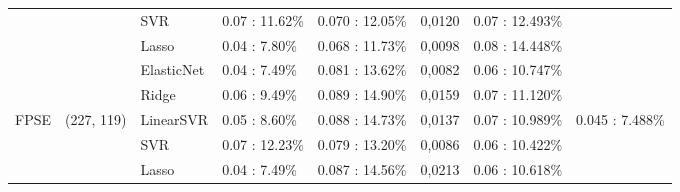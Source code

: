 \begin{tabular}{lllllrll}
        &              &         SVR &  0.07 : 11.62\% &  0.070  : 12.05\% &       0,0120 &  0.07 : 12.493\% &                  \\ \cline{3-8}
        &              &       Lasso &   0.04 : 7.80\% &  0.068  : 11.73\% &       0,0098 &  0.08 : 14.448\% &                  \\ \cline{3-8}
        &              &  ElasticNet &   0.04 : 7.49\% &  0.081  : 13.62\% &       0,0082 &  0.06 : 10.747\% &                  \\ \cline{3-8}
        &              &       Ridge &   0.06 : 9.49\% &  0.089  : 14.90\% &       0,0159 &  0.07 : 11.120\% &                  \\ \cline{3-8}
   FPSE &   (227, 119) &   LinearSVR &   0.05 : 8.60\% &  0.088  : 14.73\% &       0,0137 &  0.07 : 10.989\% &   0.045 : 7.488\% \\ \cline{1-8}
        &              &         SVR &  0.07 : 12.23\% &  0.079  : 13.20\% &       0,0086 &  0.06 : 10.422\% &                  \\ \cline{3-8}
        &              &       Lasso &   0.04 : 7.49\% &  0.087  : 14.56\% &       0,0213 &  0.06 : 10.618\% &                  \\ \cline{3-8}
\bottomrule
\end{tabular}
